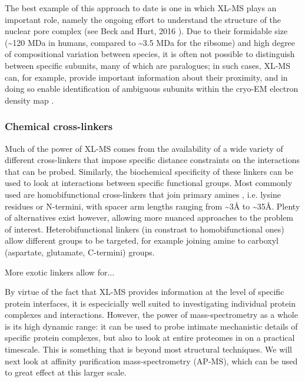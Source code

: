 \documentclass[a4paper,11pt,twoside,openright]{scrbook}
\begin{document}
The best example of this approach to date is one in which XL-MS plays an important role, namely the ongoing effort to understand the structure of the nuclear pore complex (see Beck and Hurt, 2016 \cite{Beck2016}). Due to their formidable size (\textasciitilde 120 MDa in humans, compared to \textasciitilde 3.5 MDa for the ribsome) and high degree of compositional variation between species, it is often not possible to distinguish between specific subunits, many of which are paralogues; in such cases, XL-MS can, for example, provide important information about their proximity, and in doing so enable identification of ambiguous subunits within the cryo-EM electron density map \cite{Bui2013}.

\subsubsection{Chemical cross-linkers}
Much of the power of XL-MS comes from the availability of a wide variety of different cross-linkers that impose specific distance constraints on the interactions that can be probed. Similarly, the biochemical specificity of these linkers can be used to look at interactions between specific functional groups. Most commonly used are homobifunctional cross-linkers that join primary amines \cite{Leitner2016}, i.e. lysine residues or N-termini, with spacer arm lengths ranging from \textasciitilde 3Å to \textasciitilde 35Å. Plenty of alternatives exist however, allowing more nuanced approaches to the problem of interest. Heterobifunctional linkers (in constrast to homobifunctional ones) allow different groups to be targeted, for example joining amine to carboxyl (aspartate, glutamate, C-termini) groups.

More exotic linkers allow for...


By virtue of the fact that XL-MS provides information at the level of specific protein interfaces, it is especicially well suited to investigating individual protein complexes and interactions. However, the power of mass-spectrometry as a whole is its high dynamic range: it can be used to probe intimate mechanistic details of specific protein complexes, but also to look at entire proteomes in on a practical timescale. This is something that is beyond most structural techniques. We will next look at affinity purification mass-spectrometry (AP-MS), which can be used to great effect at this larger scale.
\end{document}
